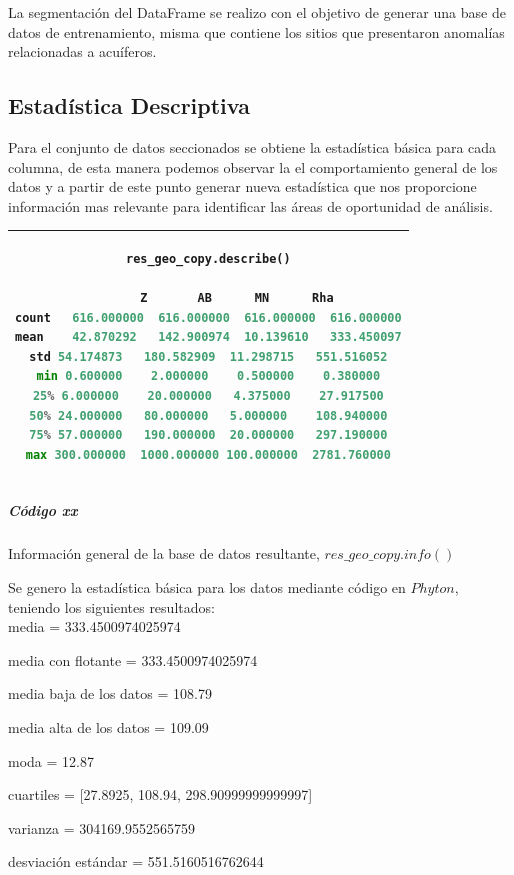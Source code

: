 \documentclass[sn-mathphys,Numbered]{sn-jnl}%
\theoremstyle{thmstyleone}%
\theoremstyle{thmstyletwo}%
\theoremstyle{thmstylethree}%
\begin{document}
La segmentación del DataFrame se realizo con el objetivo de generar una base de datos de entrenamiento, misma que contiene los sitios que presentaron anomalías relacionadas a acuíferos.


\subsection{Estadística Descriptiva}\label{subsec4}

Para el conjunto de datos seccionados se obtiene la estadística básica para cada columna, de esta manera podemos observar la el comportamiento general de los datos y a partir de este punto generar nueva estadística que nos proporcione información mas relevante para identificar las áreas de oportunidad de análisis.

\begin{center}
	\begin{tabular}{|c|}
		\hline
{\small \begin{lstlisting}[language=python]
res_geo_copy.describe()

		Z		AB		MN		Rha
count	616.000000	616.000000	616.000000	616.000000
mean	42.870292	142.900974	10.139610	333.450097
std	54.174873	180.582909	11.298715	551.516052
min	0.600000	2.000000	0.500000	0.380000
25%	6.000000	20.000000	4.375000	27.917500
50%	24.000000	80.000000	5.000000	108.940000
75%	57.000000	190.000000	20.000000	297.190000
max	300.000000	1000.000000	100.000000	2781.760000
\end{lstlisting}}\\
	\hline
\end{tabular}
\subparagraph*{Código xx}{\footnotesize Información general de la base de datos resultante, $res\_geo\_copy.info()$}
\end{center}

Se genero la estadística básica para los datos mediante código en $Phyton$, teniendo los siguientes resultados:\\

media = 333.4500974025974

media con flotante = 333.4500974025974

media baja de los datos = 108.79

media alta de los datos = 109.09

moda = 12.87

cuartiles = [27.8925, 108.94, 298.90999999999997]

varianza = 304169.9552565759

desviación estándar = 551.5160516762644
\end{document}
